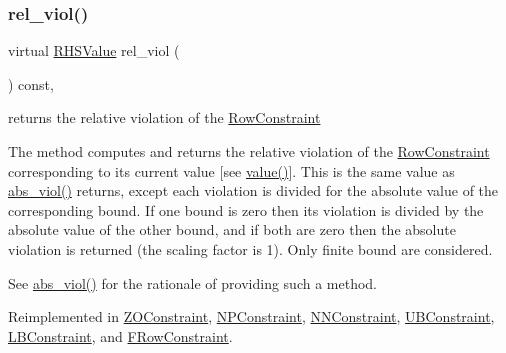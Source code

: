\mbox{\label{class_s_m_spp__di__unipi__it_1_1_row_constraint_ab62e87cff922e3aa37b8a0b5644b4ecc}} 
\subsubsection{\texorpdfstring{rel\+\_\+viol()}{rel\_viol()}}
{\footnotesize\ttfamily virtual \mbox{\hyperlink{class_s_m_spp__di__unipi__it_1_1_row_constraint_a8813536ab3b13a81c8e83a999ade3bd8}{R\+H\+S\+Value}} rel\+\_\+viol (\begin{DoxyParamCaption}\item[{void}]{ }\end{DoxyParamCaption}) const\hspace{0.3cm}{\ttfamily [inline]}, {\ttfamily [virtual]}}



returns the relative violation of the \mbox{\hyperlink{class_s_m_spp__di__unipi__it_1_1_row_constraint}{Row\+Constraint}} 

The method computes and returns the relative violation of the \mbox{\hyperlink{class_s_m_spp__di__unipi__it_1_1_row_constraint}{Row\+Constraint}} corresponding to its current value \mbox{[}see \mbox{\hyperlink{class_s_m_spp__di__unipi__it_1_1_row_constraint_a42562ba0a608bdc52a80a2bb512d0603}{value()}}\mbox{]}. This is the same value as \mbox{\hyperlink{class_s_m_spp__di__unipi__it_1_1_row_constraint_a4207e8720a4543e4840b795a3d97b4e0}{abs\+\_\+viol()}} returns, except each violation is divided for the absolute value of the corresponding bound. If one bound is zero then its violation is divided by the absolute value of the other bound, and if both are zero then the absolute violation is returned (the scaling factor is 1). Only finite bound are considered.

See \mbox{\hyperlink{class_s_m_spp__di__unipi__it_1_1_row_constraint_a4207e8720a4543e4840b795a3d97b4e0}{abs\+\_\+viol()}} for the rationale of providing such a method. 

Reimplemented in \mbox{\hyperlink{class_s_m_spp__di__unipi__it_1_1_z_o_constraint_a44cb3a18055d2b46764d4eb21a0ff032}{Z\+O\+Constraint}}, \mbox{\hyperlink{class_s_m_spp__di__unipi__it_1_1_n_p_constraint_a44cb3a18055d2b46764d4eb21a0ff032}{N\+P\+Constraint}}, \mbox{\hyperlink{class_s_m_spp__di__unipi__it_1_1_n_n_constraint_a44cb3a18055d2b46764d4eb21a0ff032}{N\+N\+Constraint}}, \mbox{\hyperlink{class_s_m_spp__di__unipi__it_1_1_u_b_constraint_a44cb3a18055d2b46764d4eb21a0ff032}{U\+B\+Constraint}}, \mbox{\hyperlink{class_s_m_spp__di__unipi__it_1_1_l_b_constraint_a44cb3a18055d2b46764d4eb21a0ff032}{L\+B\+Constraint}}, and \mbox{\hyperlink{class_s_m_spp__di__unipi__it_1_1_f_row_constraint_ae95c7d10b4128f20cefa7bb25628f5f5}{F\+Row\+Constraint}}.

